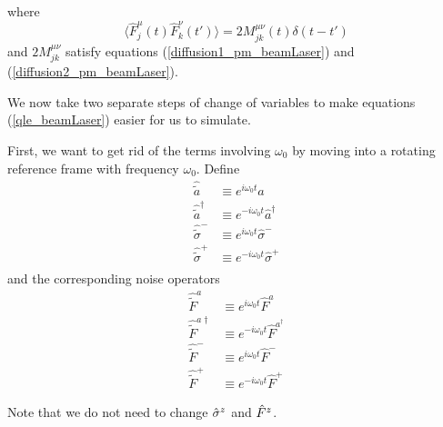 \documentclass{article}
\begin{document}
where 
\begin{equation}
    \langle \hat{F}^\mu_j(t) \hat{F}^\nu_k(t') \rangle = 2 M^{\mu\nu}_{jk}(t) \delta(t-t')
\end{equation}
and $2 M^{\mu\nu}_{jk}$ satisfy equations (\ref{diffusion1_pm_beamLaser}) and (\ref{diffusion2_pm_beamLaser}).

We now take two separate steps of change of variables to make equations (\ref{qle_beamLaser}) easier for us to simulate.

First, we want to get rid of the terms involving $\omega_0$ by moving into a rotating reference frame with frequency $\omega_0$. Define
\begin{align}
    \hat{\tilde{a}} &\equiv e^{i\omega_0 t}\hat{a}\\
    \hat{\tilde{a}}^\dagger &\equiv e^{-i\omega_0 t}\hat{a}^\dagger\\
    \hat{\tilde{\sigma}}^- &\equiv e^{i\omega_0 t}\hat{\sigma}^-\\
    \hat{\tilde{\sigma}}^+ &\equiv e^{-i\omega_0 t}\hat{\sigma}^+\\
\end{align}
and the corresponding noise operators
\begin{align}
    \hat{\tilde{F}}^a&\equiv e^{i\omega_0 t}\hat{F}^a\\
    \hat{\tilde{F}}^{a\dagger} &\equiv e^{-i\omega_0 t}\hat{F}^{a^\dagger}\\
    \hat{\tilde{F}}^- &\equiv e^{i\omega_0 t}\hat{F}^-\\
    \hat{\tilde{F}}^+ &\equiv e^{-i\omega_0 t}\hat{F}^+
\end{align}

Note that we do not need to change $\Hat{\sigma}^z$ and $\Hat{F}^z$.
\end{document}
